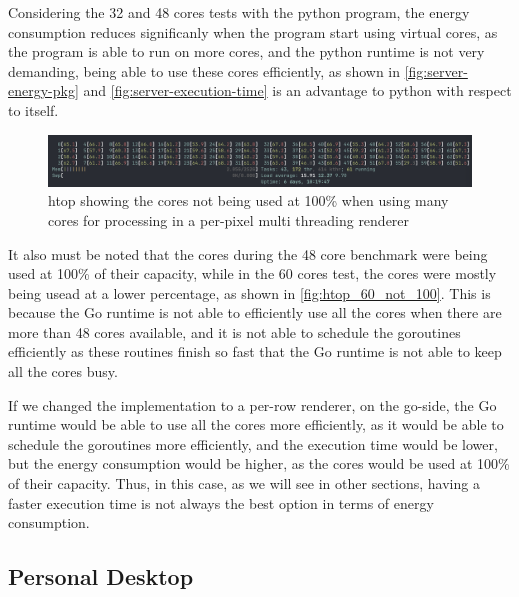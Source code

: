 Considering the 32 and 48 cores tests with the python program, the energy consumption reduces significanly when the program start using virtual cores, as the program is able to run on more cores, and the python runtime is not very demanding, being able to use these cores efficiently, as shown in \autoref{fig:server-energy-pkg} and \autoref{fig:server-execution-time} is an advantage to python with respect to itself.



\begin{figure}
    \centering
    \includegraphics[width=1\linewidth]{img/htop_not_running_100_60_cores.png}
    \caption{\gls{htop} showing the cores not being used at 100\% when using many cores for processing in a per-pixel multi threading renderer }
    \label{fig:htop_60_not_100}
\end{figure}

It also must be noted that the cores during the 48 core benchmark were being used at 100\% of their capacity, while in the 60 cores test, the cores were mostly being usead at a lower percentage, as shown in \autoref{fig:htop_60_not_100}. This is because the Go runtime is not able to efficiently use all the cores when there are more than 48 cores available, and it is not able to schedule the goroutines efficiently as these routines finish so fast that the Go runtime is not able to keep all the cores busy.

If we changed the implementation to a per-row renderer, on the go-side, the Go runtime would be able to use all the cores more efficiently, as it would be able to schedule the goroutines more efficiently, and the execution time would be lower, but the energy consumption would be higher, as the cores would be used at 100\% of their capacity. Thus, in this case, as we will see in other sections, having a faster execution time is not always the best option in terms of energy consumption.







\subsection{Personal Desktop}
